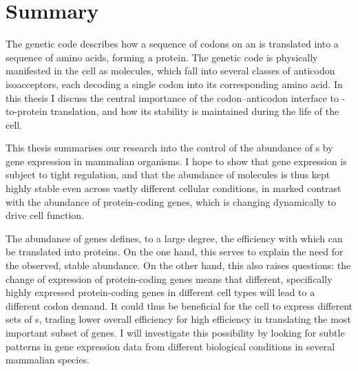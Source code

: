 \chapter*{Summary}

The genetic code describes how a sequence of codons on an  is
translated into a sequence of amino acids, forming a protein. The genetic code
is physically manifested in the cell as  molecules, which fall into
several classes of anticodon isoacceptors, each decoding a single codon into its
corresponding amino acid. In this thesis I discuss the central importance of the
codon--anticodon interface to -to-protein translation, and how its
stability is maintained during the life of the cell.

This thesis summarises our research into the control of the abundance of
s by  gene expression in mammalian organisms. I hope to
show that  gene expression is subject to tight regulation, and that
the abundance of  molecules is thus kept highly stable even across
vastly different cellular conditions, in marked contrast with the abundance of
protein-coding genes, which is changing dynamically to drive cell function.

The abundance of  genes defines, to a large degree, the efficiency
with which  can be translated into proteins. On the one hand, this
serves to explain the need for the observed, stable  abundance. On
the other hand, this also raises questions: the change of expression of
protein-coding genes means that different, specifically highly expressed
protein-coding genes in different cell types will lead to a different codon
demand. It could thus be beneficial for the cell to express different sets of
s, trading lower overall efficiency for high efficiency in
translating the most important subset of genes. I will investigate this
possibility by looking for subtle patterns in gene expression data from
different biological conditions in several mammalian species.
